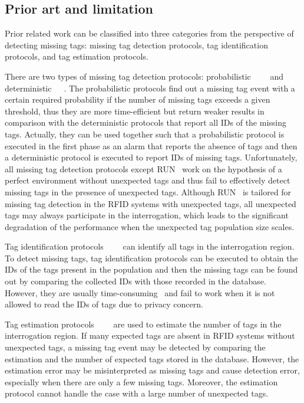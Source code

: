 \documentclass[10pt, twocolumn]{IEEEtran}
\begin{document}
\subsection{Prior art and limitation}
Prior related work can be classified into three categories from the perspective of detecting missing tags: missing tag detection protocols, tag identification protocols, and tag estimation protocols.

There are two types of missing tag detection protocols: probabilistic~\cite{tan2008monitor}~\cite{luo2012probabilistic}~\cite{luo2014missing}~\cite{shahzad2015expecting} and deterministic~\cite{li2010identifying}~\cite{zhang2011fast}~\cite{liu2015completely}. The probabilistic protocols find out a missing tag event with a certain required probability if the number of missing tags exceeds a given threshold, thus they are more time-efficient but return weaker results in comparison with the deterministic protocols that report all IDs of the missing tags. Actually, they can be used together such that a probabilistic protocol is executed in the first phase as an alarm that reports the absence of tags and then a deterministic protocol is executed to report IDs of missing tags. Unfortunately, all missing tag detection protocols except RUN~\cite{shahzad2015expecting} work on the hypothesis of a perfect environment without unexpected tags and thus fail to effectively detect missing tags in the presence of unexpected tags. Although RUN~\cite{shahzad2015expecting} is tailored for missing tag detection in the RFID systems with unexpected tags, all unexpected tags may always participate in the interrogation, which leads to the significant degradation of the performance when the unexpected tag population size scales.

Tag identification protocols~\cite{myung2006adaptive}~\cite{namboodiri2010energy}~\cite{la2011anticollision}~\cite{shahzad2013probabilistic} can identify all tags in the interrogation region. To detect missing tags, tag identification protocols can be executed to obtain the IDs of the tags present in the population and then the missing tags can be found out by comparing the collected IDs with those recorded in the database. However, they are usually time-consuming~\cite{li2010identifying} and fail to work when it is not allowed to read the IDs of tags due to privacy concern.

Tag estimation protocols~\cite{qian2011cardinality}~\cite{shahzad2012everybit}~\cite{zheng2013zoe}~\cite{chen2013understanding} are used to estimate the number of tags in the interrogation region. If many expected tags are absent in RFID systems without unexpected tags, a missing tag event may be detected by comparing the estimation and the number of expected tags stored in the database. However, the estimation error may be misinterpreted as missing tags and cause detection error, especially when there are only a few missing tags. Moreover, the estimation protocol cannot handle the case with a large number of unexpected tags.
\end{document}
